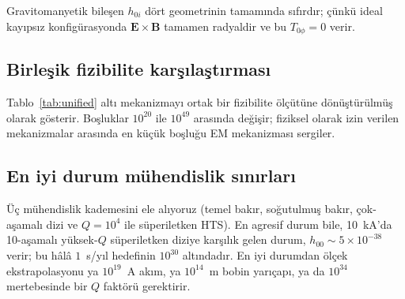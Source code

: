 \documentclass[11pt,a4paper,twocolumn]{article}
\begin{document}
Gravitomanyetik bileşen $h_{0i}$ dört geometrinin tamamında sıfırdır;
çünkü ideal kayıpsız konfigürasyonda $\mathbf{E}\times\mathbf{B}$
tamamen radyaldir ve bu $T_{0\phi}=0$ verir.

\subsection{Birleşik fizibilite karşılaştırması}
\label{subsec:unified}

Tablo~\ref{tab:unified} altı mekanizmayı ortak bir fizibilite
ölçütüne dönüştürülmüş olarak gösterir. Boşluklar $10^{20}$ ile
$10^{49}$ arasında değişir; fiziksel olarak izin verilen mekanizmalar
arasında en küçük boşluğu EM mekanizması sergiler.

\begin{table}[t]
\centering
\caption{Altı mekanizma arasında birleşik fizibilite.
Boşluk $=$ gereken kaynak $/$ cihaz ölçeği değeri.}
\label{tab:unified}
\end{table}

\subsection{En iyi durum mühendislik sınırları}
\label{subsec:best_case}

Üç mühendislik kademesini ele alıyoruz (temel bakır, soğutulmuş
bakır, çok-aşamalı dizi ve $Q=10^4$ ile süperiletken HTS). En
agresif durum bile, 10~kA'da 10-aşamalı yüksek-$Q$ süperiletken
diziye karşılık gelen durum, $h_{00} \sim 5\times 10^{-38}$ verir;
bu hâlâ $1$~s/yıl hedefinin $10^{30}$ altındadır. En iyi durumdan
ölçek ekstrapolasyonu ya $10^{19}$~A akım, ya $10^{14}$~m bobin
yarıçapı, ya da $10^{34}$ mertebesinde bir $Q$ faktörü gerektirir.
\end{document}
